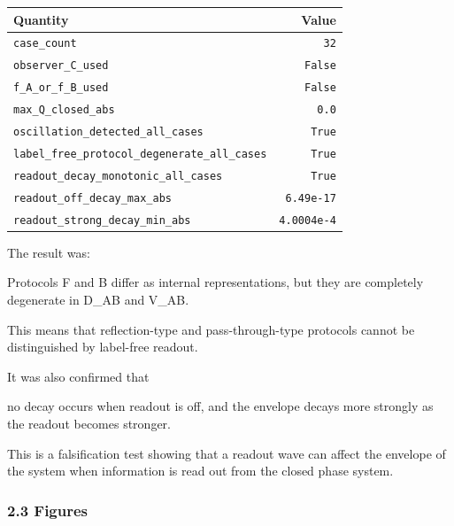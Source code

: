 \documentclass[
]{article}
\newenvironment{Shaded}{}{}
\newcommand{\NormalTok}[1]{#1}
\newcounter{none} %
\begin{document}
{\def\LTcaptype{none} %
\begin{longtable}[]{@{}lr@{}}
\toprule\noalign{}
Quantity & Value \\
\midrule\noalign{}
\endhead
\bottomrule\noalign{}
\endlastfoot
\texttt{case\_count} & \texttt{32} \\
\texttt{observer\_C\_used} & \texttt{False} \\
\texttt{f\_A\_or\_f\_B\_used} & \texttt{False} \\
\texttt{max\_Q\_closed\_abs} & \texttt{0.0} \\
\texttt{oscillation\_detected\_all\_cases} & \texttt{True} \\
\texttt{label\_free\_protocol\_degenerate\_all\_cases} &
\texttt{True} \\
\texttt{readout\_decay\_monotonic\_all\_cases} & \texttt{True} \\
\texttt{readout\_off\_decay\_max\_abs} & \texttt{6.49e-17} \\
\texttt{readout\_strong\_decay\_min\_abs} & \texttt{4.0004e-4} \\
\end{longtable}
}

The result was:

\begin{Shaded}
\begin{Highlighting}[]
\NormalTok{Protocols F and B differ as internal representations,}
\NormalTok{but they are completely degenerate in D\_AB and V\_AB.}
\end{Highlighting}
\end{Shaded}

This means that reflection-type and pass-through-type protocols cannot
be distinguished by label-free readout.

It was also confirmed that

\begin{Shaded}
\begin{Highlighting}[]
\NormalTok{no decay occurs when readout is off,}
\NormalTok{and the envelope decays more strongly as the readout becomes stronger.}
\end{Highlighting}
\end{Shaded}

This is a falsification test showing that a readout wave can affect the
envelope of the system when information is read out from the closed
phase system.

\subsubsection{2.3 Figures}\label{figures}
\end{document}
